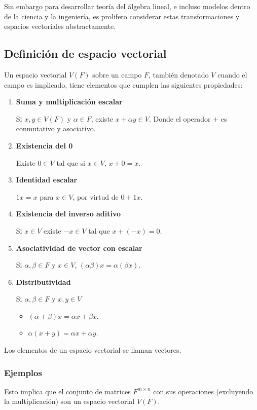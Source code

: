 \documentclass{article}
\begin{document}
Sin embargo para desarrollar teoría del álgebra lineal, e incluso modelos dentro de la ciencia y la ingeniería, es prolifero considerar estas transformaciones y espacios vectoriales abstractamente.

\subsection{Definición de espacio vectorial}
Un espacio vectorial $V(F)$ sobre un campo $F$, también denotado $V$ cuando el campo es implicado, tiene elementos que cumplen las siguientes propiedades:
\begin{enumerate}
    \item \textbf{Suma y multiplicación escalar}
    
    Si $x,y\in V(F)$ y $\alpha \in F$, existe $x+\alpha y \in V$.
    Donde el operador $+$ es conmutativo y asociativo.
    
    \item \textbf{Existencia del 0}
    
    Existe $0\in V$ tal que si $x\in V$, $x+0 = x$.

    \item \textbf{Identidad escalar}
    
    $1x = x$ para $x\in V$, por virtud de $0+1x$.

    \item \textbf{Existencia del inverso aditivo}

    Si $x\in V$ existe $-x\in V$ tal que $x+(-x) = 0$.
    
    \item \textbf{Asociatividad de vector con escalar}

    Si $\alpha, \beta\in F$ y $x\in V$,
    $(\alpha\beta)x = \alpha (\beta x)$.
    
    \item \textbf{Distributividad}

    Si $\alpha,\beta\in F$ y $x,y\in V$
    \begin{itemize}
        \item $(\alpha+\beta)x = \alpha x + \beta x$.
        \item $\alpha (x + y) = \alpha x + \alpha y$.
    \end{itemize}
\end{enumerate}

Los elementos de un espacio vectorial se llaman vectores.

\subsubsection*{Ejemplos}
Esto implica que el conjunto de matrices $F^{m\times n}$ con sus
operaciones (excluyendo la multiplicación) son un espacio vectorial $V(F)$.
\end{document}

